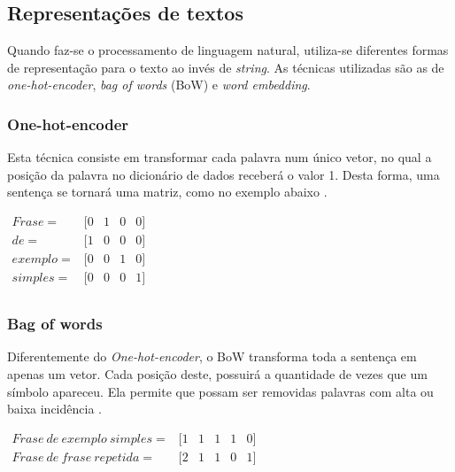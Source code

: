 \subsection{Representações de textos}

Quando faz-se o processamento de linguagem natural, utiliza-se diferentes formas de representação para o texto ao invés de \textit{string}. As técnicas utilizadas são as de \textit{one-hot-encoder}, \textit{bag of words} (BoW) e \textit{word embedding}.

\subsubsection{One-hot-encoder}

Esta técnica consiste em transformar cada palavra num único vetor, no qual a posição da palavra no dicionário de dados receberá o valor 1. Desta forma, uma sentença se tornará uma matriz, como no exemplo abaixo \cite{BRINK2015}.

\begin{center}
    $
    \begin{array}{rcccc}
        Frase = & [ 0 & 1 & 0 & 0 ]  \\
        de  = & [ 1 & 0 & 0 & 0 ]  \\
        exemplo = & [ 0 & 0 & 1 & 0 ]  \\
        simples = & [ 0 & 0 & 0 & 1 ]  \\
    \end{array}
  	$
\end{center}

\subsubsection{Bag of words}

Diferentemente do \textit{One-hot-encoder}, o BoW transforma toda a sentença em apenas um vetor. Cada posição deste, possuirá a quantidade de vezes que um símbolo apareceu. Ela permite que possam ser removidas palavras com alta ou baixa incidência \cite{BRINK2015}.

\begin{center}
    $
    \begin{array}{rccccc}
        \label{ex:bow}
        Frase\ de\ exemplo\ simples = & [ 1 & 1 & 1 & 1 & 0]  \\
        Frase\ de\ frase\ repetida = & [ 2 & 1 & 1 & 0 & 1]  \\
    \end{array}
  	$
\end{center}

